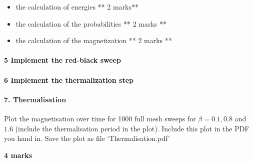 \documentclass[11pt]{article}
\providecommand{\tightlist}{%
      \setlength{\itemsep}{0pt}\setlength{\parskip}{0pt}}
\begin{document}
\begin{itemize}
\tightlist
\item
  the calculation of energies ** 2 marks**
\item
  the calculation of the probabilities ** 2 marks **
\item
  the calculation of the magnetization ** 2 marks **
\end{itemize}

    \hypertarget{implement-the-red-black-sweep}{%
\paragraph{5 Implement the red-black
sweep}\label{implement-the-red-black-sweep}}

    \hypertarget{implement-the-thermalization-step}{%
\paragraph{6 Implement the thermalization
step}\label{implement-the-thermalization-step}}

    \hypertarget{thermalisation}{%
\paragraph{7. Thermalisation}\label{thermalisation}}

Plot the magnetisation over time for 1000 full mesh sweeps for
\(\beta = 0.1, 0.8\) and \(1.6\) (include the thermalisation period in
the plot). Include this plot in the PDF you hand in. Save the plot as
file `Thermalisation.pdf'

\textbf{4 marks}
\end{document}
